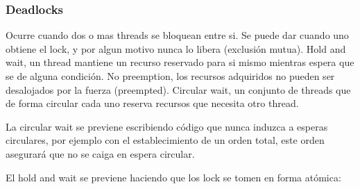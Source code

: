 \documentclass[titlepage,a4paper]{article}
\begin{document}
\subsubsection*{Deadlocks}
Ocurre cuando dos o mas threads se bloquean entre si. Se puede dar cuando uno obtiene el lock, y por algun motivo nunca lo libera (exclusión mutua). Hold and wait, un thread mantiene un recurso reservado para si mismo mientras espera que se de alguna condición. No preemption, los recursos adquiridos no pueden ser desalojados por la fuerza (preempted). Circular wait, un conjunto de threads que de forma circular cada uno reserva recursos que necesita otro thread.

La circular wait se previene escribiendo código que nunca induzca a esperas circulares, por ejemplo con el establecimiento de un orden total, este orden asegurará que no se caiga en espera circular.

El hold and wait se previene haciendo que los lock se tomen en forma atómica:
\end{document}
